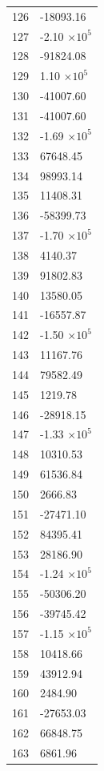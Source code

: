 \documentclass[a4paper,11pt]{article}
\begin{document}
\begin{center}
\begin{longtable}{|R{1.5cm}|R{2.6cm}|}
  126 &    -18093.16 \\
  127 &        -2.10 $\times 10^{           5}$ \\
  128 &    -91824.08 \\
  129 &         1.10 $\times 10^{           5}$ \\
  130 &    -41007.60 \\
  131 &    -41007.60 \\
  132 &        -1.69 $\times 10^{           5}$ \\
  133 &     67648.45 \\
  134 &     98993.14 \\
  135 &     11408.31 \\
  136 &    -58399.73 \\
  137 &        -1.70 $\times 10^{           5}$ \\
  138 &      4140.37 \\
  139 &     91802.83 \\
  140 &     13580.05 \\
  141 &    -16557.87 \\
  142 &        -1.50 $\times 10^{           5}$ \\
  143 &     11167.76 \\
  144 &     79582.49 \\
  145 &      1219.78 \\
  146 &    -28918.15 \\
  147 &        -1.33 $\times 10^{           5}$ \\
  148 &     10310.53 \\
  149 &     61536.84 \\
  150 &      2666.83 \\
  151 &    -27471.10 \\
  152 &     84395.41 \\
  153 &     28186.90 \\
  154 &        -1.24 $\times 10^{           5}$ \\
  155 &    -50306.20 \\
  156 &    -39745.42 \\
  157 &        -1.15 $\times 10^{           5}$ \\
  158 &     10418.66 \\
  159 &     43912.94 \\
  160 &      2484.90 \\
  161 &    -27653.03 \\
  162 &     66848.75 \\
  163 &      6861.96 \\

\end{longtable}
\end{center}
\end{document}
